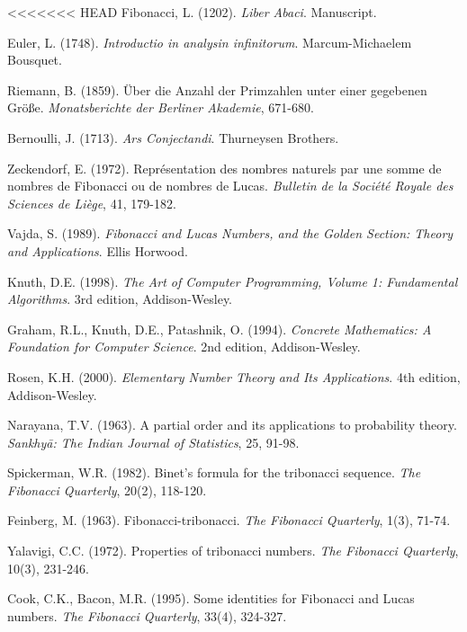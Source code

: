 \documentclass[12pt]{article}
\theoremstyle{plain}
\theoremstyle{definition}
\begin{document}
\begin{thebibliography}{99}

<<<<<<< HEAD
 Fibonacci, L. (1202). \emph{Liber Abaci}. Manuscript.

 Euler, L. (1748). \emph{Introductio in analysin infinitorum}. Marcum-Michaelem Bousquet.

 Riemann, B. (1859). Über die Anzahl der Primzahlen unter einer gegebenen Größe. \emph{Monatsberichte der Berliner Akademie}, 671-680.

 Bernoulli, J. (1713). \emph{Ars Conjectandi}. Thurneysen Brothers.

 Zeckendorf, E. (1972). Représentation des nombres naturels par une somme de nombres de Fibonacci ou de nombres de Lucas. \emph{Bulletin de la Société Royale des Sciences de Liège}, 41, 179-182.

 Vajda, S. (1989). \emph{Fibonacci and Lucas Numbers, and the Golden Section: Theory and Applications}. Ellis Horwood.

 Knuth, D.E. (1998). \emph{The Art of Computer Programming, Volume 1: Fundamental Algorithms}. 3rd edition, Addison-Wesley.

 Graham, R.L., Knuth, D.E., Patashnik, O. (1994). \emph{Concrete Mathematics: A Foundation for Computer Science}. 2nd edition, Addison-Wesley.

 Rosen, K.H. (2000). \emph{Elementary Number Theory and Its Applications}. 4th edition, Addison-Wesley.

 Narayana, T.V. (1963). A partial order and its applications to probability theory. \emph{Sankhyā: The Indian Journal of Statistics}, 25, 91-98.

 Spickerman, W.R. (1982). Binet's formula for the tribonacci sequence. \emph{The Fibonacci Quarterly}, 20(2), 118-120.

 Feinberg, M. (1963). Fibonacci-tribonacci. \emph{The Fibonacci Quarterly}, 1(3), 71-74.

 Yalavigi, C.C. (1972). Properties of tribonacci numbers. \emph{The Fibonacci Quarterly}, 10(3), 231-246.

 Cook, C.K., Bacon, M.R. (1995). Some identities for Fibonacci and Lucas numbers. \emph{The Fibonacci Quarterly}, 33(4), 324-327.


\end{thebibliography}
\end{document}
